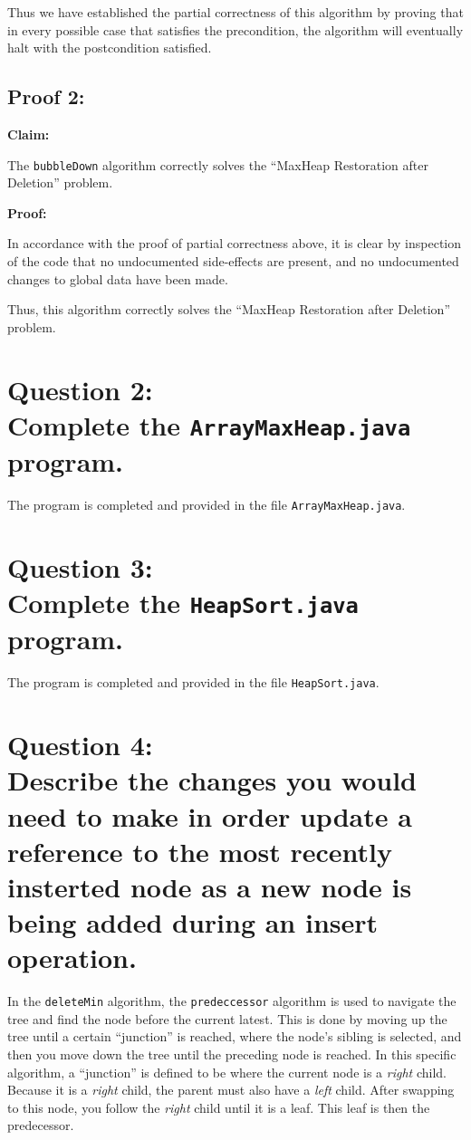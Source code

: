 \documentclass[a4paper, 12pt, titlepage]{article}
\def\code#1{\texttt{#1}}
\begin{document}
Thus we have established the partial correctness of this algorithm by proving that in every possible case that satisfies the precondition,
the algorithm will eventually halt with the postcondition satisfied.


\subsection*{Proof 2:}

\noindent
\textbf{Claim:}

The \code{bubbleDown} algorithm correctly solves the ``MaxHeap Restoration after Deletion'' problem.

\noindent
\textbf{Proof:}

In accordance with the proof of partial correctness above,
it is clear by inspection of the code that no undocumented side-effects are present,
and no undocumented changes to global data have been made.

Thus,
this algorithm correctly solves the ``MaxHeap Restoration after Deletion'' problem.

\section*{Question 2:\\Complete the \code{ArrayMaxHeap.java} program.}

The program is completed and provided in the file \code{ArrayMaxHeap.java}.

\section*{Question 3:\\Complete the \code{HeapSort.java} program.}

The program is completed and provided in the file \code{HeapSort.java}.

\section*{Question 4:\\Describe the changes you would need to make in order update a reference to the most recently insterted node as a new node is being added during an insert operation.}

In the \code{deleteMin} algorithm,
the \code{predeccessor} algorithm is used to navigate the tree and find the node before the current latest.
This is done by moving up the tree until a certain ``junction'' is reached,
where the node's sibling is selected,
and then you move down the tree until the preceding node is reached.
In this specific algorithm,
a ``junction'' is defined to be where the current node is a \textit{right} child.
Because it is a \textit{right} child,
the parent must also have a \textit{left} child.
After swapping to this node,
you follow the \textit{right} child until it is a leaf.
This leaf is then the predecessor.
\end{document}
